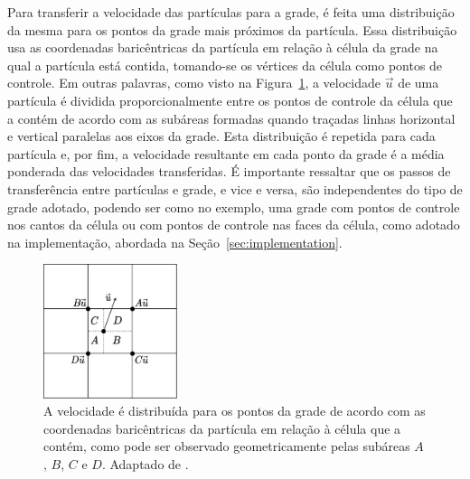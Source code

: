 \documentclass[12pt,a4paper,dvipsnames]{article}
\newcommand{\secref}[1]{Seção~\ref{#1}}
\newcommand{\figref}[1]{Figura~\ref{#1}}
\begin{document}
Para transferir a velocidade das partículas para a grade, é feita uma distribuição da mesma para os pontos da grade mais próximos da partícula. Essa distribuição usa as coordenadas baricêntricas da partícula em relação à célula da grade na qual a partícula está contida, tomando-se os vértices da célula como pontos de controle. Em outras palavras, como visto na \figref{fig:transferparticlecell}, a velocidade $\Vec{u}$ de uma partícula é dividida proporcionalmente entre os pontos de controle da célula que a contém de acordo com as subáreas formadas quando traçadas linhas horizontal e vertical paralelas aos eixos da grade. Esta distribuição é repetida para cada partícula e, por fim, a velocidade resultante em cada ponto da grade é a média ponderada das velocidades transferidas. É importante ressaltar que os passos de transferência entre partículas e grade, e vice e versa, são independentes do tipo de grade adotado, podendo ser como no exemplo, uma grade com pontos de controle nos cantos da célula ou com pontos de controle nas faces da célula, como adotado na implementação, abordada na \secref{sec:implementation}.

\begin{figure}[ht]
\centering
\includegraphics[width=0.35\textwidth]{Particle2Grid.pdf}
\caption{A velocidade é distribuída para os pontos da grade de acordo com as coordenadas baricêntricas da partícula em relação à célula que a contém, como pode ser observado geometricamente pelas subáreas $A$, $B$, $C$ e $D$. Adaptado de \cite{kim_2017}.}
\label{fig:transferparticlecell}
\end{figure}
\end{document}
